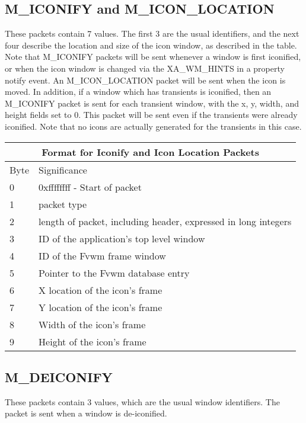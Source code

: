 \subsection{M\_ICONIFY and M\_ICON\_LOCATION}
These packets contain 7 values. The first 3 are the usual identifiers,
and the next four describe the location and size of the icon window,
as described in the table. Note that M\_ICONIFY packets will be sent
whenever a window is first iconified, or when the icon window is changed
via the XA\_WM\_HINTS in a property notify event. An M\_ICON\_LOCATION
packet will be sent when the icon is moved.
In addition, if a window which has transients is
iconified, then an M\_ICONIFY packet is sent for each transient
window, with the x, y, width, and height fields set to 0. This packet
will be sent even if the transients were already iconified. Note that
no icons are actually generated for the transients in this case.


\begin{table}
\begin{center}
\begin{tabular}[h]{|l|l|} \hline
\multicolumn{2}{|c|}{Format for Iconify and Icon Location Packets} \\ \hline
Byte &Significance \\\hline
0    & 0xffffffff - Start of packet \\
1    & packet type \\
2    & length of packet, including header, expressed in long integers
\\ \hline
3    & ID of the application's top level window \\
4    & ID of the Fvwm frame window \\
5    & Pointer to the Fvwm database entry \\
6    & X location of the icon's frame \\
7    & Y location of the icon's frame\\
8    & Width of the icon's frame \\
9    & Height of the icon's frame \\ \hline
\end{tabular}
\end{center}
\end{table}

\subsection{M\_DEICONIFY}
These packets contain 3 values, which are the usual window
identifiers. The packet is sent when a window is de-iconified.

